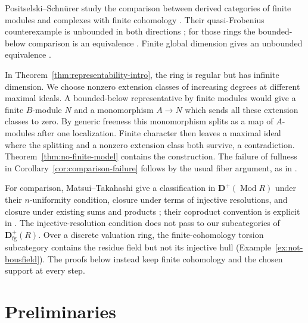 \documentclass[11pt]{amsart}
\numberwithin{equation}{section}
\theoremstyle{definition}
\theoremstyle{remark}
\newcommand{\D}{\mathbf D}
\newcommand{\fg}{\mathrm{fg}}
\newcommand{\Mod}{\operatorname{Mod}}
\begin{document}
Positselski--Schn\"urer study the comparison between derived
categories of finite modules and complexes with finite cohomology
\cite{PS21}. Their quasi-Frobenius counterexample is unbounded
in both directions \cite[Theorem~3.1]{PS21}; for those rings the
bounded-below comparison is an equivalence
\cite[Section~3, (3.2) and remarks~(a)--(b)]{PS21}.
Finite global dimension gives an unbounded equivalence
\cite[Corollaries~4.5 and~5.11]{PS21}.

In Theorem~\ref{thm:representability-intro}, the ring is regular
but has infinite dimension. We choose nonzero extension classes
of increasing degrees at different maximal ideals. A bounded-below
representative by finite modules would give a finite $B$-module
$N$ and a monomorphism $A\to N$ which sends all these extension
classes to zero. By generic freeness this monomorphism splits
as a map of $A$-modules after one localization. Finite character then leaves
a maximal ideal where the splitting and a nonzero extension class
both survive, a contradiction. Theorem~\ref{thm:no-finite-model}
contains the construction. The failure of fullness in
Corollary~\ref{cor:comparison-failure} follows by the usual fiber
argument, as in \cite[proof of Theorem~3.1]{PS21}.

For comparison, Matsui--Takahashi give a classification in
$\D^+(\Mod R)$ under their $n$-uniformity condition, closure under terms of injective
resolutions, and closure under existing sums and products
\cite[Theorem~6.7(1)]{MT22}; their coproduct convention is explicit
in \cite[Convention~2.1]{MT22}. The injective-resolution condition
does not pass to our subcategories of $\D^+_{\fg}(R)$.
Over a discrete valuation ring, the finite-cohomology torsion
subcategory contains the residue field but not its injective hull
(Example~\ref{ex:not-bousfield}). The proofs below instead keep
finite cohomology and the chosen support at every step.

\section{Preliminaries}\label{sec:preliminaries}
\end{document}
